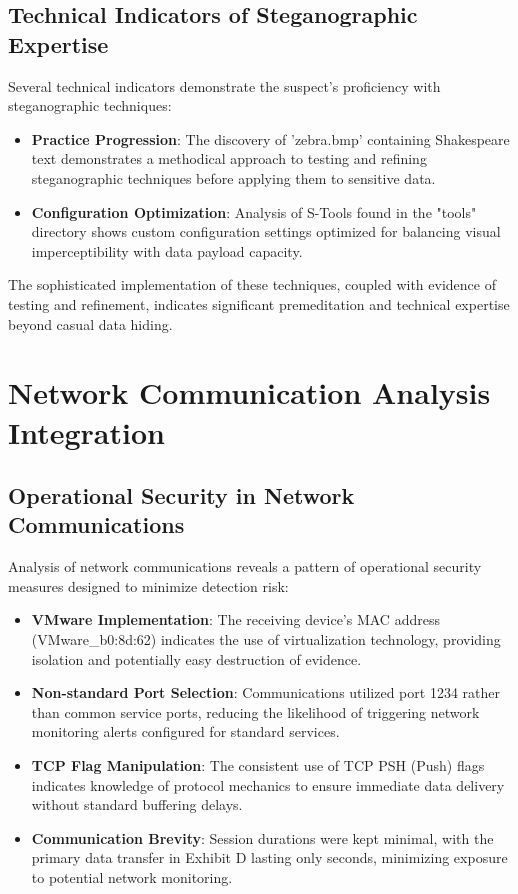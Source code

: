 \subsection{Technical Indicators of Steganographic Expertise}
Several technical indicators demonstrate the suspect's proficiency with steganographic techniques:

\begin{itemize}

    \item \textbf{Practice Progression}: The discovery of 'zebra.bmp' containing Shakespeare text demonstrates a methodical approach to testing and refining steganographic techniques before applying them to sensitive data.
    
    \item \textbf{Configuration Optimization}: Analysis of S-Tools found in the "tools" directory shows custom configuration settings optimized for balancing visual imperceptibility with data payload capacity.
\end{itemize}

The sophisticated implementation of these techniques, coupled with evidence of testing and refinement, indicates significant premeditation and technical expertise beyond casual data hiding.

\section{Network Communication Analysis Integration}
\subsection{Operational Security in Network Communications}
Analysis of network communications reveals a pattern of operational security measures designed to minimize detection risk:

\begin{itemize}
    \item \textbf{VMware Implementation}: The receiving device's MAC address (VMware\_b0:8d:62) indicates the use of virtualization technology, providing isolation and potentially easy destruction of evidence.
    
    \item \textbf{Non-standard Port Selection}: Communications utilized port 1234 rather than common service ports, reducing the likelihood of triggering network monitoring alerts configured for standard services.
    
    \item \textbf{TCP Flag Manipulation}: The consistent use of TCP PSH (Push) flags indicates knowledge of protocol mechanics to ensure immediate data delivery without standard buffering delays.
    
    \item \textbf{Communication Brevity}: Session durations were kept minimal, with the primary data transfer in Exhibit D lasting only seconds, minimizing exposure to potential network monitoring.
\end{itemize}

